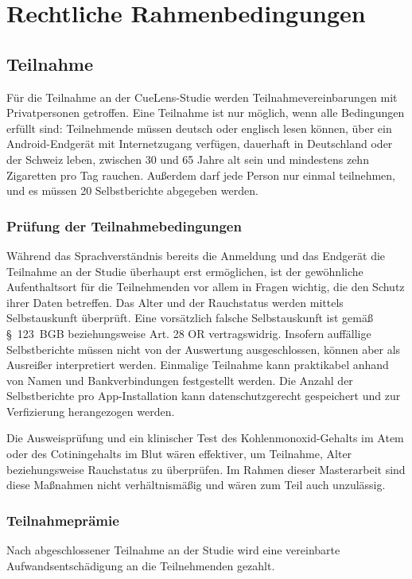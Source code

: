 
\chapter{Rechtliche Rahmenbedingungen}
\section{Teilnahme}
Für die Teilnahme an der CueLens-Studie werden Teilnahmevereinbarungen mit Privatpersonen getroffen. Eine Teilnahme ist nur möglich, wenn alle Bedingungen erfüllt sind: Teilnehmende müssen deutsch oder englisch lesen können, über ein Android-Endgerät mit Internetzugang verfügen, dauerhaft in Deutschland oder der Schweiz leben, zwischen 30 und 65 Jahre alt sein und mindestens zehn Zigaretten pro Tag rauchen. Außerdem darf jede Person nur einmal teilnehmen, und es müssen 20 Selbstberichte abgegeben werden. 

\subsection{Prüfung der Teilnahmebedingungen}
Während das Sprachverständnis bereits die Anmeldung und das Endgerät die Teilnahme an der Studie überhaupt erst ermöglichen, ist der gewöhnliche Aufenthaltsort für die Teilnehmenden vor allem in Fragen wichtig, die den Schutz ihrer Daten betreffen. Das Alter und der Rauchstatus werden mittels Selbstauskunft überprüft. Eine vorsätzlich falsche Selbstauskunft ist gemäß §~123~BGB beziehungsweise Art. 28 OR vertragswidrig. Insofern auffällige Selbstberichte müssen nicht von der Auswertung ausgeschlossen, können aber als Ausreißer interpretiert werden. Einmalige Teilnahme kann praktikabel anhand von Namen und Bankverbindungen festgestellt werden. Die Anzahl der Selbstberichte pro App-Installation kann datenschutzgerecht gespeichert und zur Verfizierung herangezogen werden. 

Die Ausweisprüfung und ein klinischer Test des Kohlenmonoxid-Gehalts im Atem oder des Cotiningehalts im Blut wären effektiver, um Teilnahme, Alter beziehungsweise Rauchstatus zu überprüfen. Im Rahmen dieser Masterarbeit sind diese Maßnahmen nicht verhältnismäßig und wären zum Teil auch unzulässig.
 
\subsection{Teilnahmeprämie}
Nach abgeschlossener Teilnahme an der Studie wird eine vereinbarte Aufwandsentschädigung an die Teilnehmenden gezahlt.

